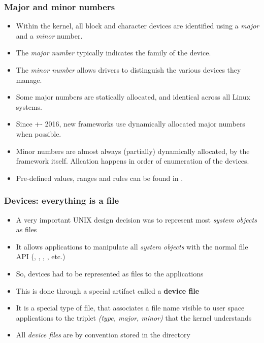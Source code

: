 \begin{frame}
  \frametitle{Major and minor numbers}
  \begin{itemize}
  \item Within the kernel, all block and character devices are
    identified using a {\em major} and a {\em minor} number.
  \item The {\em major number} typically indicates the family of the
    device.
  \item The {\em minor number} allows drivers to distinguish
    the various devices they manage.
  \item Some major numbers are statically allocated, and
    identical across all Linux systems.
  \item Since +- 2016, new frameworks use dynamically allocated major
    numbers when possible.
  \item Minor numbers are almost always (partially) dynamically allocated,
    by the framework itself. Allcation happens in order of enumeration of
    the devices.
  \item Pre-defined values, ranges and rules can be found in
    .
  \end{itemize}
\end{frame}

\begin{frame}
  \frametitle{Devices: everything is a file}
  \begin{itemize}
  \item A very important UNIX design decision was to represent most
    {\em system objects} as files
  \item It allows applications to manipulate all {\em system objects} with
    the normal file API (, , ,
    , etc.)
  \item So, devices had to be represented as files to the applications
  \item This is done through a special artifact called a {\bf device
      file}
  \item It is a special type of file, that associates a file name
    visible to user space applications to the triplet {\em (type,
      major, minor)} that the kernel understands
  \item All {\em device files} are by convention stored in the
     directory
  \end{itemize}
\end{frame}

